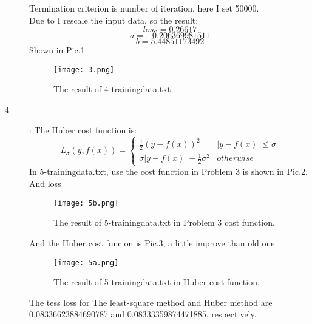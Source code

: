 \documentclass[UTF8]{ctexart}
\begin{document}
\begin{description}
Termination criterion is number of iteration, here I set 50000.\\
Due to I rescale the input data, so the result:
$$loss = 0.26617$$
$$a = -0.206369981511$$
$$b = 5.44851173492$$
Shown in Pic.1
\begin{figure}
\centering
        \texttt{[image: 3.png]}
    \caption{The result of 4-trainingdata.txt}
    \label{fig:verticalcell}
\end{figure}
\item[4]: The Huber cost function is:
\[
L_{\sigma}(y,f(x)) = 
\begin{cases}
\frac{1}{2}(y-f(x))^2 & |y-f(x)|\leq\sigma\\
\sigma |y-f(x)| - \frac{1}{2}\sigma^2 & otherwise
\end{cases}
\]
In 5-trainingdata.txt, use the cost function in Problem 3 is shown in Pic.2.\\
And loss 
\begin{figure}
\centering
        \texttt{[image: 5b.png]}
    \caption{The result of 5-trainingdata.txt in Problem 3 cost function.}
    \label{fig:verticalcell}
\end{figure}
And the Huber cost funcion is Pic.3, a little improve than old one.

\begin{figure}
\centering
        \texttt{[image: 5a.png]}
    \caption{The result of 5-trainingdata.txt in Huber cost function.}
    \label{fig:verticalcell}
\end{figure}
The tess loss for The least-square method and Huber method are 0.08336623884690787 and 0.08333359874471885, respectively.

\end{description}
\end{document}
